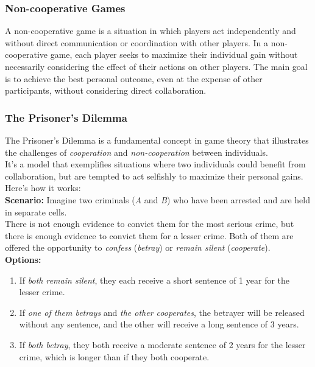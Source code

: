 \subsubsection{Non-cooperative Games}
A non-cooperative game is a situation in which players act independently and without direct communication or coordination with other players.
In a non-cooperative game, each player seeks to maximize their individual gain without necessarily considering the effect of their actions on other players.
The main goal is to achieve the best personal outcome, even at the expense of other participants, without considering direct collaboration.


\subsubsection{The Prisoner's Dilemma}
The Prisoner's Dilemma is a fundamental concept in game theory that illustrates the challenges of \textit{cooperation} and \textit{non-cooperation} between individuals. \\
It's a model that exemplifies situations where two individuals could benefit from collaboration, but are tempted to act selfishly to maximize their personal gains. \\
Here's how it works:
\\

\textbf{Scenario:}
Imagine two criminals (\textit{A} and \textit{B}) who have been arrested and are held in separate cells. \\
There is not enough evidence to convict them for the most serious crime, but there is enough evidence to convict them for a lesser crime.
Both of them are offered the opportunity to \textit{confess} (\textit{betray}) or \textit{remain silent} (\textit{cooperate}).
\\

\textbf{Options:}
\begin{enumerate}
    \item {If \textit{both remain silent}, they each receive a short sentence of 1 year for the lesser crime.}
    \item {If \textit{one of them betrays} and \textit{the other cooperates}, the betrayer will be released without any sentence, and the other will receive a long sentence of 3 years.}
    \item {If \textit{both betray}, they both receive a moderate sentence of 2 years for the lesser crime, which is longer than if they both cooperate.}
\end{enumerate}

